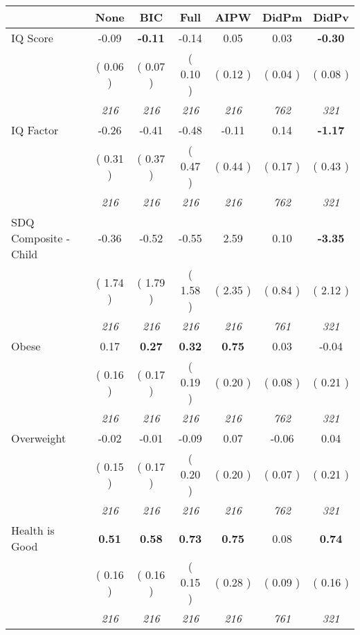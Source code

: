 \begin{tabular}{l c c c c c c}
\toprule
 & None & BIC & Full & AIPW & DidPm & DidPv \\
\midrule
IQ Score &     -0.09 & \textbf{     -0.11 } &     -0.14 &      0.05 &      0.03 & \textbf{     -0.30 } \\
& (     0.06 ) & (     0.07 ) & (     0.10 ) & (     0.12 ) & (     0.04 ) & (     0.08 ) \\
& \textit{ 216 } & \textit{ 216 } & \textit{ 216 } & \textit{ 216 } & \textit{ 762 } & \textit{ 321 } \\
IQ Factor &     -0.26 &     -0.41 &     -0.48 &     -0.11 &      0.14 & \textbf{     -1.17 } \\
& (     0.31 ) & (     0.37 ) & (     0.47 ) & (     0.44 ) & (     0.17 ) & (     0.43 ) \\
& \textit{ 216 } & \textit{ 216 } & \textit{ 216 } & \textit{ 216 } & \textit{ 762 } & \textit{ 321 } \\
SDQ Composite - Child &     -0.36 &     -0.52 &     -0.55 &      2.59 &      0.10 & \textbf{     -3.35 } \\
& (     1.74 ) & (     1.79 ) & (     1.58 ) & (     2.35 ) & (     0.84 ) & (     2.12 ) \\
& \textit{ 216 } & \textit{ 216 } & \textit{ 216 } & \textit{ 216 } & \textit{ 761 } & \textit{ 321 } \\
Obese &      0.17 & \textbf{      0.27 } & \textbf{      0.32 } & \textbf{     0.75} &      0.03 &     -0.04 \\
& (     0.16 ) & (     0.17 ) & (     0.19 ) & (     0.20 ) & (     0.08 ) & (     0.21 ) \\
& \textit{ 216 } & \textit{ 216 } & \textit{ 216 } & \textit{ 216 } & \textit{ 762 } & \textit{ 321 } \\
Overweight &     -0.02 &     -0.01 &     -0.09 &      0.07 &     -0.06 &      0.04 \\
& (     0.15 ) & (     0.17 ) & (     0.20 ) & (     0.20 ) & (     0.07 ) & (     0.21 ) \\
& \textit{ 216 } & \textit{ 216 } & \textit{ 216 } & \textit{ 216 } & \textit{ 762 } & \textit{ 321 } \\
Health is Good & \textbf{      0.51 } & \textbf{      0.58 } & \textbf{      0.73 } & \textbf{     0.75} &      0.08 & \textbf{      0.74 } \\
& (     0.16 ) & (     0.16 ) & (     0.15 ) & (     0.28 ) & (     0.09 ) & (     0.16 ) \\
& \textit{ 216 } & \textit{ 216 } & \textit{ 216 } & \textit{ 216 } & \textit{ 761 } & \textit{ 321 } \\

\end{tabular}
